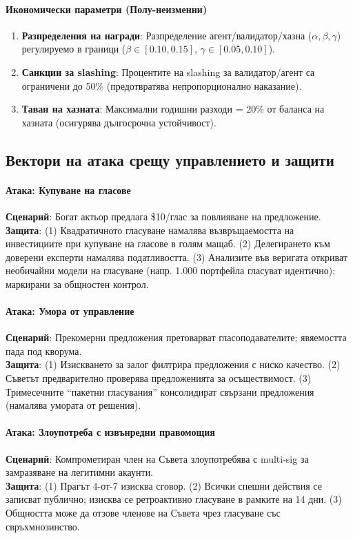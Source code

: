 \documentclass[11pt]{article}
\begin{document}
\paragraph{Икономически параметри (Полу-неизменни)}
\begin{enumerate}[noitemsep]
  \item \textbf{Разпределения на награди}: Разпределение агент/валидатор/хазна ($\alpha, \beta, \gamma$) регулируемо в граници ($\beta \in [0.10, 0.15]$, $\gamma \in [0.05, 0.10]$).
  \item \textbf{Санкции за slashing}: Процентите на slashing за валидатор/агент са ограничени до 50\% (предотвратява непропорционално наказание).
  \item \textbf{Таван на хазната}: Максимални годишни разходи = 20\% от баланса на хазната (осигурява дългосрочна устойчивост).
\end{enumerate}

\subsection{Вектори на атака срещу управлението и защити}

\paragraph{Атака: Купуване на гласове}
\textbf{Сценарий}: Богат актьор предлага \$10/глас за повлияване на предложение.\\
\textbf{Защита}: (1) Квадратичното гласуване намалява възвръщаемостта на инвестициите при купуване на гласове в голям мащаб. (2) Делегирането към доверени експерти намалява податливостта. (3) Анализите във веригата откриват необичайни модели на гласуване (напр. 1.000 портфейла гласуват идентично); маркирани за общностен контрол.

\paragraph{Атака: Умора от управление}
\textbf{Сценарий}: Прекомерни предложения претоварват гласоподавателите; явяемостта пада под кворума.\\
\textbf{Защита}: (1) Изискването за залог филтрира предложения с ниско качество. (2) Съветът предварително проверява предложенията за осъществимост. (3) Тримесечните ``пакетни гласувания'' консолидират свързани предложения (намалява умората от решения).

\paragraph{Атака: Злоупотреба с извънредни правомощия}
\textbf{Сценарий}: Компрометиран член на Съвета злоупотребява с multi-sig за замразяване на легитимни акаунти.\\
\textbf{Защита}: (1) Прагът 4-от-7 изисква сговор. (2) Всички спешни действия се записват публично; изисква се ретроактивно гласуване в рамките на 14 дни. (3) Общността може да отзове членове на Съвета чрез гласуване със свръхмнозинство.
\end{document}
